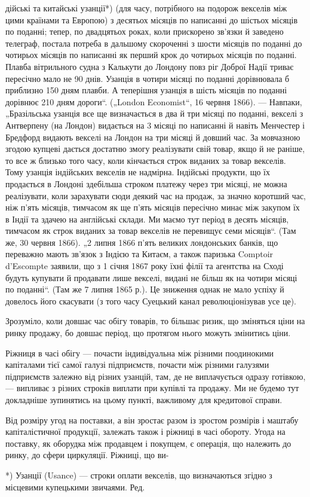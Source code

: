 дійські та китайські узанції*) (для часу, потрібного на подорож векселів
між цими країнами та Европою) з десятьох місяців по написанні до
шістьох місяців по поданні; тепер, по двадцятьох роках, коли прискорено
зв’язки й заведено телеграф, постала потреба в дальшому скороченні
з шости місяців по поданні до чотирьох місяців по написанні як
перший крок до чотирьох місяців по поданні. Плавба вітрильного судна
з Калькути до Лондону повз ріг Доброї Надії триває пересічно мало
не 90 днів. Узанція в чотири місяці по поданні дорівнювала б приблизно
150 дням плавби. А теперішня узанція в шість місяців по поданні
дорівнює 210 дням дороги“. („London Economist“, 16 червня 1866). —
Навпаки, „Бразільська узанція все ще визначається в два й три місяці
по поданні, векселі з Антверпену (на Лондон) видається на 3 місяці по
написанні й навіть Менчестер і Бредфорд видають векселі на Лондон на
три місяці й довший час. За мовчазною згодою купцеві дається достатню
змогу реалізувати свій товар, якщо й не раніше, то все ж
близько того часу, коли кінчається строк виданих за товар векселів.
Тому узанція індійських векселів не надмірна. Індійські продукти, що
їх продається в Лондоні здебільша строком платежу через три місяці,
не можна реалізувати, коли зарахувати сюди деякий час на продаж, за
значно коротший час, ніж п’ять місяців, тимчасом як ще п’ять місяців
пересічно минає між закупом їх в Індії та здачею на англійські склади.
Ми маємо тут період в десять місяців, тимчасом як строк виданих за
товар векселів не перевищує семи місяців“. (Там же, 30 червня 1866).
„2 липня 1866 п’ять великих лондонських банків, що переважно мають
зв’язок з Індією та Китаєм, а також паризька Comptoir d’Escompte заявили,
що з 1 січня 1867 року їхні філії та агентства на Сході будуть
купувати й продавати лише векселі, видані не більш як на чотири місяці
по поданні“. (Там же 7 липня 1865 р.). Це зниження однак не мало
успіху й довелось його скасувати (з того часу Суецький канал революціонізував
усе це).

Зрозуміло, коли довшає час обігу товарів, то більшає ризик, що
зміняться ціни на ринку продажу, бо довшає період, що протягом нього
можуть змінитись ціни.

Ріжниця в часі обігу — почасти індивідуальна між різними поодинокими
капіталами тієї самої галузі підприємств, почасти між різними галузями
підприємств залежно від різних узанцій, там, де не виплачується
одразу готівкою, — випливає з різних строків виплати при купівлі та
продажу. Ми не будемо тут докладніше зупинятись на цьому пункті,
важливому для кредитової справи.

Від розміру угод на поставки, а він зростає разом із зростом розмірів
і маштабу капіталістичної продукції, залежать також і ріжниці в часі
обороту. Угода на поставку, як оборудка між продавцем і покупцем, є
операція, що належить до ринку, до сфери циркуляції. Ріжниці, що ви-

*) Узанції (Usance) — строки оплати векселів, що визначаються згідно з місцевими
купецькими звичаями. Ред.
